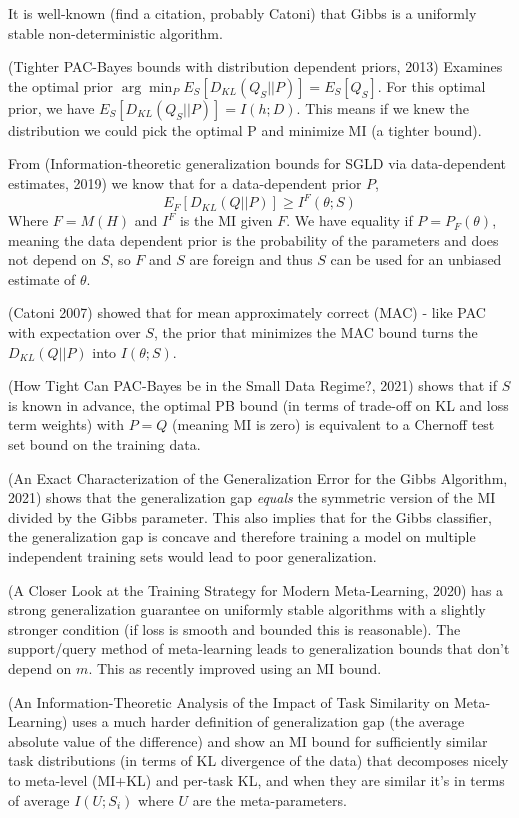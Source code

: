 \documentclass[letterpaper]{article}
\theoremstyle{definition}
\begin{document}
It is well-known (find a citation, probably Catoni) that Gibbs is a uniformly stable non-deterministic algorithm.

(Tighter PAC-Bayes bounds with distribution dependent priors, 2013) Examines the optimal prior $\arg\min_P E_S\left [D_{KL}(Q_S||P)\right ]=E_S\left [Q_S\right ]$. For this optimal prior, we have $E_S\left [D_{KL}(Q_S||P)\right ]=I(h; D) $. This means if we knew the distribution we could pick the optimal P and minimize MI (a tighter bound).

From (Information-theoretic generalization bounds for SGLD via data-dependent estimates, 2019) we know that for a data-dependent prior $P$, $$E_F\left [D_{KL}(Q||P)\right ]\geq I^F(\theta;S)$$
Where $F=M(H)$ and $I^F$ is the MI given $F$. We have equality if $P=P_F(\theta)$, meaning the data dependent prior is the probability of the parameters and does not depend on $S$, so $F$ and $S$ are foreign and thus $S$ can be used for an unbiased estimate of $\theta$.

(Catoni 2007) showed that for mean approximately correct (MAC) - like PAC with expectation over $S$, the prior that minimizes the MAC bound turns the $D_{KL}(Q||P)$ into $I(\theta;S)$.

(How Tight Can PAC-Bayes be in the Small Data Regime?, 2021) shows that if $S$ is known in advance, the optimal PB bound (in terms of trade-off on KL and loss term weights) with $P=Q$ (meaning MI is zero) is equivalent to a Chernoff test set bound on the training data. 

(An Exact Characterization of the Generalization Error for the Gibbs Algorithm, 2021) shows that the generalization gap \emph{equals} the symmetric version of the MI divided by the Gibbs parameter. This also implies that for the Gibbs classifier, the generalization gap is concave and therefore training a model on multiple independent training sets would lead to poor generalization.

(A Closer Look at the Training Strategy for Modern Meta-Learning, 2020) has a strong generalization guarantee on uniformly stable algorithms with a slightly stronger condition (if loss is smooth and bounded this is reasonable). The support/query method of meta-learning leads to generalization bounds that don't depend on $m$. This as recently improved using an MI bound.

(An Information-Theoretic Analysis of the Impact of Task Similarity on Meta-Learning) uses a much harder definition of generalization gap (the average absolute value of the difference) and show an MI bound for sufficiently similar task distributions (in terms of KL divergence of the data) that decomposes nicely to meta-level (MI+KL) and per-task KL, and when they are similar it's in terms of average $I(U;S_i)$ where $U$ are the meta-parameters.
\end{document}
